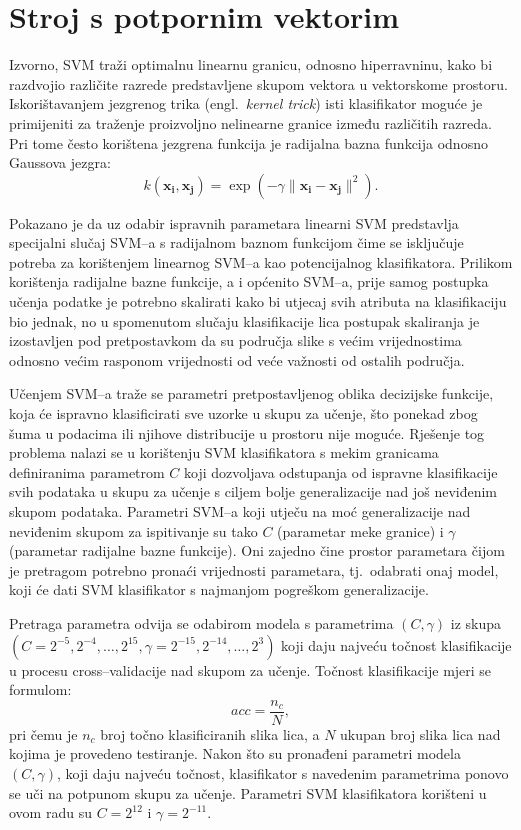 \documentclass[12pt,a4paper]{ReportAA}
\newcommand{\engl}[1]{(engl.~\emph{#1})}
\begin{document}
\section{Stroj s potpornim vektorim}
Izvorno, SVM traži optimalnu linearnu granicu, odnosno
hiperravninu, kako bi razdvojio različite razrede predstavljene skupom vektora u
vektorskome prostoru. Iskorištavanjem jezgrenog trika \engl{kernel trick} isti
klasifikator moguće je primijeniti za traženje proizvoljno nelinearne granice
između različitih razreda. Pri tome često korištena jezgrena funkcija je
radijalna bazna funkcija odnosno Gaussova jezgra:
\begin{equation}
k(\mathbf{x_i},\mathbf{x_j})=\exp(-\gamma \|\mathbf{x_i} - \mathbf{x_j}\|^2).
\end{equation}

Pokazano je da uz odabir ispravnih parametara \citep{keerthi2003asymptotic} linearni SVM
predstavlja specijalni slučaj SVM--a s radijalnom baznom funkcijom čime
se isključuje potreba za korištenjem linearnog SVM--a kao potencijalnog
klasifikatora. Prilikom korištenja radijalne bazne funkcije, a i općenito
SVM--a, prije samog postupka učenja podatke je potrebno skalirati kako bi utjecaj svih
atributa na klasifikaciju bio jednak, no u spomenutom slučaju klasifikacije
lica postupak skaliranja je izostavljen pod pretpostavkom da su područja slike s
većim vrijednostima odnosno većim rasponom vrijednosti od veće važnosti od
ostalih područja. 

Učenjem SVM--a traže se parametri pretpostavljenog oblika decizijske funkcije,
koja će ispravno klasificirati sve uzorke u skupu za učenje, što ponekad zbog
šuma u podacima ili njihove distribucije u prostoru nije moguće. Rješenje tog
problema nalazi se u korištenju SVM klasifikatora s mekim granicama definiranima
parametrom $C$ koji dozvoljava odstupanja od ispravne klasifikacije svih podataka
u skupu za učenje s ciljem bolje generalizacije nad još neviđenim skupom
podataka. Parametri SVM--a koji utječu na moć generalizacije nad neviđenim skupom
za ispitivanje su tako $C$ (parametar meke granice) i $\gamma$ (parametar
radijalne bazne funkcije). Oni zajedno čine prostor parametara čijom je pretragom
potrebno pronaći vrijednosti parametara, tj.~odabrati onaj model, koji će dati
SVM klasifikator s najmanjom pogreškom generalizacije.

Pretraga parametra odvija se odabirom modela s parametrima $(C, \gamma)$ iz skupa
$\left (C = {2^{-5}, 2^{-4}, \ldots , 2^{15}},  \gamma = {2^{-15}, 2^{-14},
\ldots, 2^3} \right )$ \citep{CC01a} koji daju najveću točnost klasifikacije u
procesu cross--validacije nad skupom za učenje. Točnost klasifikacije mjeri se formulom:
\begin{equation}
acc = \frac{n_c}{N},
\end{equation}
pri čemu je $n_c$ broj točno klasificiranih slika lica, a $N$ ukupan broj slika
lica nad kojima je provedeno testiranje. Nakon što su pronađeni parametri modela $(C,
\gamma)$, koji daju najveću točnost, klasifikator s navedenim parametrima ponovo
se uči na potpunom skupu za učenje. Parametri SVM klasifikatora korišteni u ovom
radu su $C = 2^{12}$ i $\gamma = 2^{-11}$.
\end{document}
